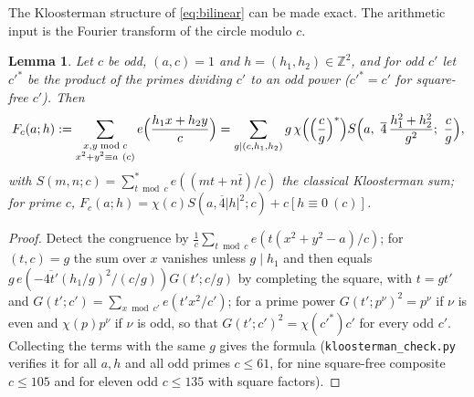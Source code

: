 ﻿\documentclass[11pt]{amsart}
\newtheorem{lemma}[theorem]{Lemma}
\theoremstyle{remark}
\newcommand{\Z}{\mathbb{Z}}
\begin{document}
The Kloosterman structure of \eqref{eq:bilinear} can be made exact. The arithmetic input is the Fourier transform of the circle modulo $c$.

\begin{lemma}\label{lem:circle}
Let $c$ be odd, $(a,c)=1$ and $h=(h_1,h_2)\in\Z^2$, and for odd $c'$ let $c'^{*}$ be the product of the primes dividing $c'$ to an odd power ($c'^{*}=c'$ for square-free $c'$). Then
\[
F_c(a;h):=\sum_{\substack{x,y\bmod c\\ x^2+y^2\equiv a\ (c)}}e\Bigl(\frac{h_1x+h_2y}{c}\Bigr)=\sum_{g\mid(c,h_1,h_2)}g\,\chi\Bigl(\Bigl(\frac cg\Bigr)^{*}\Bigr)S\Bigl(a,\ \overline4\,\frac{h_1^2+h_2^2}{g^2};\ \frac cg\Bigr),
\]
with $S(m,n;c)=\sum^*_{t\bmod c}e((mt+n\bar t)/c)$ the classical Kloosterman sum; for prime $c$, $F_c(a;h)=\chi(c)S(a,\overline4|h|^2;c)+c[h\equiv0\ (c)]$.
\end{lemma}
\begin{proof}
Detect the congruence by $\frac1c\sum_{t\bmod c}e(t(x^2+y^2-a)/c)$; for $(t,c)=g$ the sum over $x$ vanishes unless $g\mid h_1$ and then equals $g\,e(-\overline{4t'}(h_1/g)^2/(c/g))G(t';c/g)$ by completing the square, with $t=gt'$ and $G(t';c')=\sum_{x\bmod c'}e(t'x^2/c')$; for a prime power $G(t';p^\nu)^2=p^\nu$ if $\nu$ is even and $\chi(p)p^\nu$ if $\nu$ is odd, so that $G(t';c')^2=\chi(c'^{*})c'$ for every odd $c'$. Collecting the terms with the same $g$ gives the formula (\texttt{kloosterman\_check.py} verifies it for all $a,h$ and all odd primes $c\le61$, for nine square-free composite $c\le105$ and for eleven odd $c\le135$ with square factors).
\end{proof}
\end{document}
